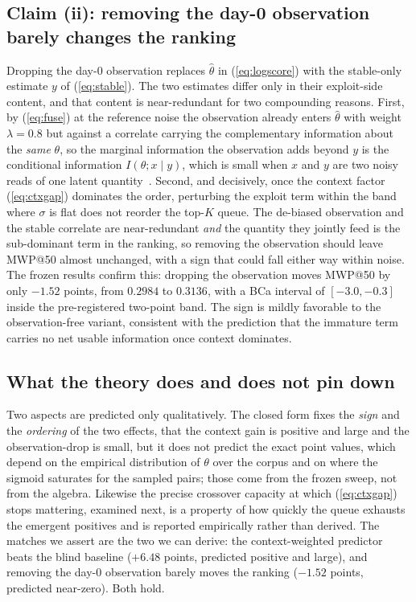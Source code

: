\documentclass[journal]{IEEEtran}
\begin{document}
\subsection{Claim (ii): removing the day-0 observation barely changes the ranking}
Dropping the day-0 observation replaces $\hat\theta$ in (\ref{eq:logscore}) with the stable-only
estimate $y$ of (\ref{eq:stable}). The two estimates differ only in their exploit-side content, and
that content is near-redundant for two compounding reasons. First, by (\ref{eq:fuse}) at the
reference noise the observation already enters $\hat\theta$ with weight $\lambda = 0.8$ but against a
correlate carrying the complementary information about the \emph{same} $\theta$, so the marginal
information the observation adds beyond $y$ is the conditional information $I(\theta; x \mid y)$,
which is small when $x$ and $y$ are two noisy reads of one latent
quantity~\cite{cover2006elements}. Second, and decisively, once the context factor (\ref{eq:ctxgap})
dominates the order, perturbing the exploit term within the band where $\sigma$ is flat does not
reorder the top-$K$ queue. The de-biased observation and the stable correlate are near-redundant
\emph{and} the quantity they jointly feed is the sub-dominant term in the ranking, so removing the
observation should leave MWP@50 almost unchanged, with a sign that could fall either way within
noise. The frozen results confirm this: dropping the observation moves MWP@50 by only $-1.52$
points, from $0.2984$ to $0.3136$, with a BCa interval of $[-3.0, -0.3]$ inside the pre-registered
two-point band. The sign is mildly favorable to the observation-free variant, consistent with the
prediction that the immature term carries no net usable information once context dominates.

\subsection{What the theory does and does not pin down}
Two aspects are predicted only qualitatively. The closed form fixes the \emph{sign} and the
\emph{ordering} of the two effects, that the context gain is positive and large and the
observation-drop is small, but it does not predict the exact point values, which depend on the
empirical distribution of $\theta$ over the corpus and on where the sigmoid saturates for the
sampled pairs; those come from the frozen sweep, not from the algebra. Likewise the precise
crossover capacity at which (\ref{eq:ctxgap}) stops mattering, examined next, is a property of how
quickly the queue exhausts the emergent positives and is reported empirically rather than derived.
The matches we assert are the two we can derive: the context-weighted predictor beats the blind
baseline ($+6.48$ points, predicted positive and large), and removing the day-0 observation barely
moves the ranking ($-1.52$ points, predicted near-zero). Both hold.
\end{document}
